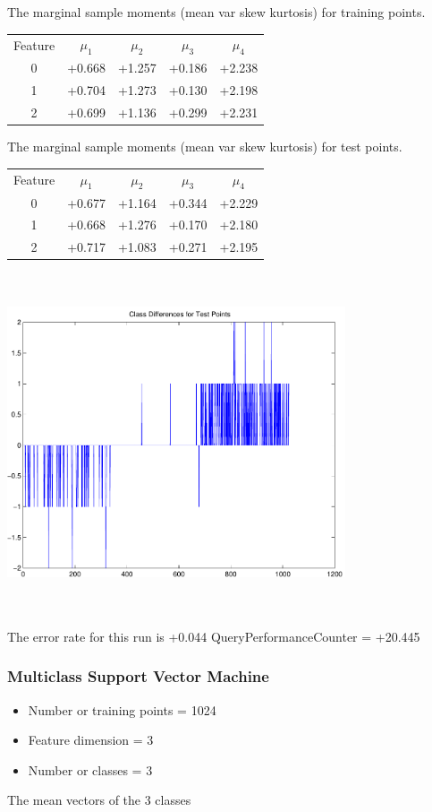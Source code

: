 \documentclass[12pt]{article}
\theoremstyle{definition}
\theoremstyle{remark}
\numberwithin{equation}{section}
\begin{document}
The marginal sample moments (mean var skew kurtosis) for training points.\newline
\begin{tabular}{ c |  c  c  c  c}
Feature & $\mu_1$ & $\mu_2$ & $\mu_3$ & $\mu_4$ \\
0 & +0.668 & +1.257 & +0.186& +2.238 \\
\hline
1 & +0.704 & +1.273 & +0.130& +2.198 \\
\hline
2 & +0.699 & +1.136 & +0.299& +2.231 \\
\hline
\end{tabular}
\newline
The marginal sample moments (mean var skew kurtosis) for test points.\newline
\begin{tabular}{ c | c  c  c  c}
Feature & $\mu_1$ & $\mu_2$ & $\mu_3$ & $\mu_4$ \\
0 & +0.677 & +1.164 & +0.344& +2.229\\
\hline
1 & +0.668 & +1.276 & +0.170& +2.180\\
\hline
2 & +0.717 & +1.083 & +0.271& +2.195\\
\hline
\end{tabular}\newline
\includegraphics[width=10.0cm,height=10.0cm]{classDiffs.pdf}

The error rate for this run is +0.044\newline
QueryPerformanceCounter  =  +20.445
\subsubsection{Multiclass Support Vector Machine }
\begin{itemize}
\item Number or training points = 1024
\item Feature dimension = 3
\item Number or classes = 3
\end{itemize}
{The mean vectors of the 3 classes}
\end{document}
